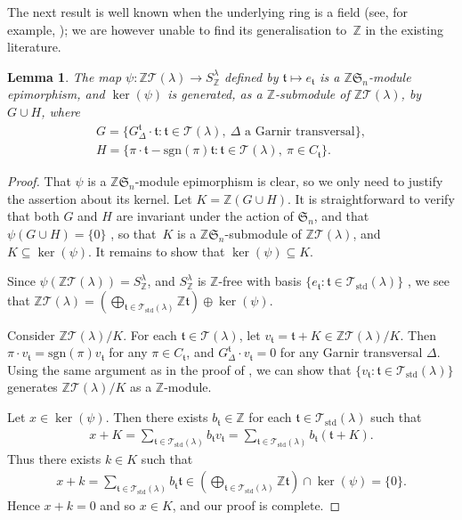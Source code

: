 \documentclass[pdftex]{sigma}
\newtheorem{Lemma}[Theorem]{Lemma}
\renewcommand{\t}{\mathfrak{t}}
\newcommand{\TT}{\mathscr{T}}
\newcommand{\sgn}{\mathrm{sgn}}
\newcommand{\sym}[1]{\mathfrak{S}_{#1}}
\newcommand{\Z}{\mathbb{Z}}
\begin{document}
The next result is well known when the underlying ring is a field (see, for example, \cite[Section~7.4, Corollary, p.~101]{WF}); we are however unable to find its generalisation to~$\mathbb{Z}$ in the existing literature.

\begin{Lemma}\label{L: annihilator for specht}
The map $\psi\colon \Z\TT(\lambda) \to S_\Z^\lambda$ defined by $\t \mapsto e_{\t}$ is a $\Z\sym{n}$-module epimorphism, and $\ker(\psi)$ is generated, as a $\Z$-submodule of $\Z\TT(\lambda)$, by $G \cup H$, where
\begin{gather*}
G= \big\{ G_{\Delta}^{\t} \cdot \t \colon \t \in \TT(\lambda),\ \Delta \text{ a Garnir transversal} \big\}, \\
H= \{ \pi \cdot \t - \sgn(\pi)\t \colon \t \in \TT(\lambda),\ \pi \in C_{\t} \}.
\end{gather*}
\end{Lemma}

\begin{proof}That $\psi$ is a $\Z\sym{n}$-module epimorphism is clear, so we only need to justify the assertion about its kernel. Let $K = \Z(G\cup H)$. It is straightforward to verify that both $G$ and $H$ are invariant under the action of $\sym{n}$, and that $\psi(G \cup H) = \{0\}$ \cite[7.2.1 and Theorem~7.2.3]{GJAK}, so that~$K$ is a $\Z\sym{n}$-submodule of $\Z\TT(\lambda)$, and $K \subseteq \ker(\psi)$. It remains to show that $\ker(\psi) \subseteq K$.

Since $\psi(\Z\TT(\lambda)) = S^{\lambda}_\Z$, and $S_\Z^{\lambda}$ is $\Z$-free with basis $\{ e_{\t} \colon \t \in \TT_{\mathrm{std}}(\lambda) \}$ \cite[Theorem~1.1]{Peel}, we see that $\Z\TT(\lambda) = (\bigoplus_{\t \in \TT_{\mathrm{std}}(\lambda)} \Z\t)\oplus \ker(\psi)$.

Consider $\Z\TT(\lambda)/K$. For each $\t \in \TT(\lambda)$, let $v_{\t} = \t + K \in \Z\TT(\lambda)/K$. Then $\pi\cdot v_\t = \sgn(\pi)v_\t$ for any $\pi \in C_{\t}$, and $G_{\Delta}^{\t} \cdot v_\t = 0$ for any Garnir transversal $\Delta$. Using the same argument as in the proof of \cite[Theorem~7.2.7]{GJAK}, we can show that $\{ v_{\t} \colon \t \in \TT_{\mathrm{std}}(\lambda) \}$ generates $\Z\TT(\lambda)/K$ as a $\Z$-module.

Let $x \in \ker(\psi)$. Then there exists $b_{\t} \in \Z$ for each $\t \in \TT_{\mathrm{std}}(\lambda)$ such that \begin{gather*}x+K = \sum_{\t \in \TT_{\mathrm{std}}(\lambda)} b_{\t}v_{\t} = \sum_{\t \in \TT_{\mathrm{std}}(\lambda)} b_{\t}(\t + K).\end{gather*}
Thus there exists $k \in K$ such that \begin{gather*}x + k = \sum_{\t \in \TT_{\mathrm{std}}(\lambda)} b_{\t}\t \in \left (\bigoplus_{\t \in \TT_{\mathrm{std}}(\lambda)} \Z\t\right ) \cap \ker(\psi) = \{0\}.\end{gather*} Hence $x + k = 0$ and so $x \in K$, and our proof is complete.
\end{proof}
\end{document}

